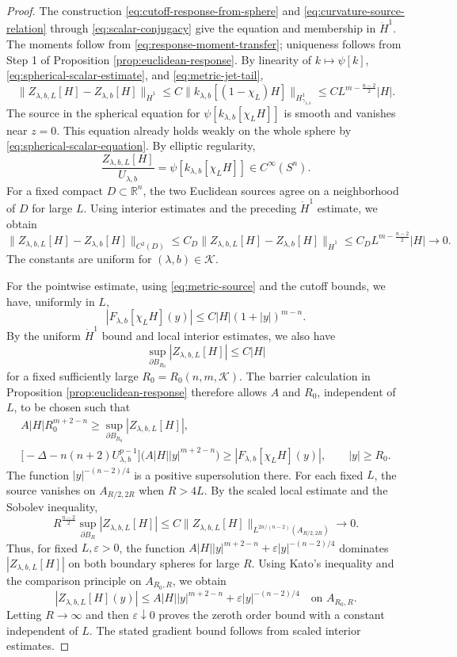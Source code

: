 \documentclass[11pt]{article}
\numberwithin{equation}{section}
\theoremstyle{remark}
\newcommand{\R}{\mathbb R}
\newcommand{\Sph}{S}
\begin{document}
\begin{proof}
{The construction \eqref{eq:cutoff-response-from-sphere} and
\eqref{eq:curvature-source-relation}  through  \eqref{eq:scalar-conjugacy} give the
equation and membership in \(\dot H^1\). The moments follow from
\eqref{eq:response-moment-transfer}; uniqueness follows from Step  1 of
Proposition  \ref{prop:euclidean-response}.}
By linearity of \(k\mapsto\psi[k]\),
\eqref{eq:spherical-scalar-estimate},
and \eqref{eq:metric-jet-tail},
 {
\[
 \|Z_{\lambda,b,L}[H]-Z_{\lambda,b}[H]\|_{\dot H^1}
 \le C\|k_{\lambda,b}[(1-\chi_L)H]\|_{H^1_{\gamma_{\lambda,b}}}
 \le CL^{m-\frac{n-2}{2}}|H|.
\]
}
The source in the spherical equation for
\(\psi[k_{\lambda,b}[\chi_LH]]\) is smooth and vanishes near \(z=0\).
This equation already holds weakly on the whole sphere by
\eqref{eq:spherical-scalar-equation}. {By elliptic regularity,}
\[
 \frac{Z_{\lambda,b,L}[H]}{U_{\lambda,b}}
 =\psi[k_{\lambda,b}[\chi_LH]]\in C^\infty(\Sph^n).
\]
For a fixed compact \(D\subset\R^n\), the two Euclidean sources agree
on a neighborhood of \(D\) for large \(L\).
{Using interior estimates and the preceding \(\dot H^1\)
estimate, we obtain}
 {
\[
 \|Z_{\lambda,b,L}[H]-Z_{\lambda,b}[H]\|_{C^2(D)}
 \le C_D\|Z_{\lambda,b,L}[H]-Z_{\lambda,b}[H]\|_{\dot H^1}
 \le C_D L^{m-\frac{n-2}{2}}|H|\to0.
\]
}
The constants are uniform for \((\lambda,b)\in\mathcal K\).

{For the pointwise estimate, using
\eqref{eq:metric-source} and the cutoff bounds, we have, uniformly in
\(L\),}
\[
 |F_{\lambda,b}[\chi_LH](y)|
 \le C|H|(1+|y|)^{m-n}.
\]
{By the uniform \(\dot H^1\) bound and local interior estimates,
we also have}
\[
 \sup_{\partial B_{R_0}}|Z_{\lambda,b,L}[H]|
 \le C|H|
\]
for a fixed sufficiently large \(R_0=R_0(n,m,\mathcal K)\).
The barrier calculation in Proposition  \ref{prop:euclidean-response}
therefore allows \(A\) and \(R_0\), independent of \(L\), to be chosen such that
\[
 \begin{gathered}
 A|H|R_0^{m+2-n}\ge
 \sup_{\partial B_{R_0}}|Z_{\lambda,b,L}[H]|,\\
 \bigl[-\Delta-n(n+2)U_{\lambda,b}^{p-1}\bigr]
 \bigl(A|H||y|^{m+2-n}\bigr)
 \ge |F_{\lambda,b}[\chi_LH](y)|,\qquad |y|\ge R_0.
 \end{gathered}
\]
The function \(|y|^{-(n-2)/4}\) is a positive supersolution there.
For each fixed \(L\), the source vanishes on \(A_{R/2,2R}\) when \(R>4L\).
{By the scaled local estimate and the Sobolev inequality,}
\[
 R^{\frac{n-2}{2}}\sup_{\partial B_R}|Z_{\lambda,b,L}[H]|
 \le C\|Z_{\lambda,b,L}[H]\|_{L^{2n/(n-2)}(A_{R/2,2R})}
 \to0.
\]
Thus, for fixed \(L,\varepsilon>0\), the function
\(A|H||y|^{m+2-n}+\varepsilon|y|^{-(n-2)/4}\) dominates
\(|Z_{\lambda,b,L}[H]|\) on both boundary spheres for large \(R\).
{Using Kato's inequality and the comparison principle on \(A_{R_0,R}\), we
obtain}
\[
 |Z_{\lambda,b,L}[H](y)|
 \le A|H||y|^{m+2-n}
 +\varepsilon|y|^{-(n-2)/4}
 \quad\text{on }A_{R_0,R}.
\]
Letting \(R\to\infty\) and then \(\varepsilon\downarrow0\) proves the
zeroth order bound with a constant independent of \(L\).
{The stated gradient bound follows from scaled interior
estimates.}
\end{proof}
\end{document}
